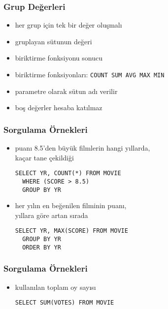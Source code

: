 \documentclass[dvipsnames]{beamer}
\theoremstyle{plain}
\begin{document}
\begin{frame}[fragile]
  \frametitle{Grup Değerleri}

  \begin{itemize}
    \item her grup için tek bir değer oluşmalı
    \item gruplayan sütunun değeri
    \item biriktirme fonksiyonu sonucu

    \pause
    \medskip
    \item biriktirme fonksiyonları: \lstinline!COUNT SUM AVG MAX MIN!
    \item parametre olarak sütun adı verilir
    \item boş değerler hesaba katılmaz
  \end{itemize}
\end{frame}

\begin{frame}[fragile]
  \frametitle{Sorgulama Örnekleri}

  \begin{itemize}
    \item puanı 8.5'den büyük filmlerin hangi yıllarda,\\
                kaçar tane çekildiği
    \begin{lstlisting}
SELECT YR, COUNT(*) FROM MOVIE
  WHERE (SCORE > 8.5)
  GROUP BY YR
    \end{lstlisting}
    
    \pause
    \item her yılın en beğenilen filminin puanı,\\
      yıllara göre artan sırada
    \begin{lstlisting}
SELECT YR, MAX(SCORE) FROM MOVIE
  GROUP BY YR
  ORDER BY YR
    \end{lstlisting}   
  \end{itemize}
\end{frame}

\begin{frame}[fragile]
  \frametitle{Sorgulama Örnekleri}

  \begin{itemize}
    \item kullanılan toplam oy sayısı
    \begin{lstlisting}
SELECT SUM(VOTES) FROM MOVIE
    \end{lstlisting}
  \end{itemize}
\end{frame}
\end{document}
